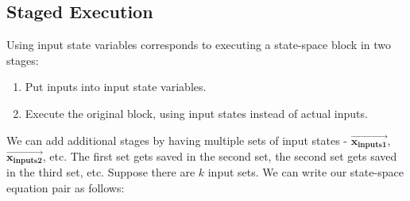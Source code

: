 \subsection{Staged Execution}

    Using input state variables corresponds to executing a state-space
block in two stages:
\begin{enumerate}
\item Put inputs into input state variables.

\item Execute the original block, using input states instead of
actual inputs.
\end{enumerate}

    We can add additional stages by having multiple sets of input
states - $\vec{\mathbf{x_{inputs1}}}$,
$\vec{\mathbf{x_{inputs2}}}$, etc. The first set gets saved in the
second set, the second set gets saved in the third set, etc.
Suppose there are $k$ input sets. We can write our state-space
equation pair as follows:
